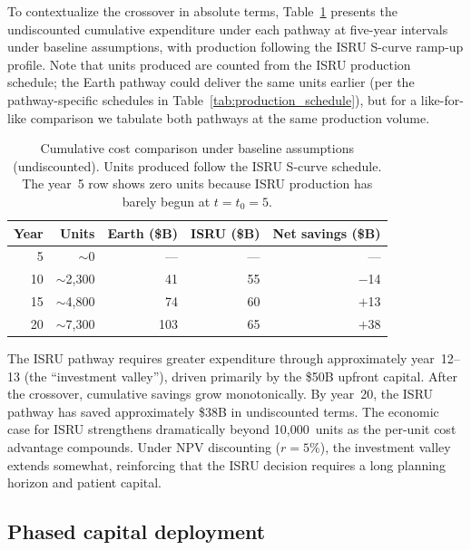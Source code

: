 \documentclass[preprint,12pt]{elsarticle}
\begin{document}
To contextualize the crossover in absolute terms, Table~\ref{tab:cumulative} presents the undiscounted cumulative expenditure under each pathway at five-year intervals under baseline assumptions, with production following the ISRU S-curve ramp-up profile. Note that units produced are counted from the ISRU production schedule; the Earth pathway could deliver the same units earlier (per the pathway-specific schedules in Table~\ref{tab:production_schedule}), but for a like-for-like comparison we tabulate both pathways at the same production volume.

\begin{table}[htbp]
\centering
\caption{Cumulative cost comparison under baseline assumptions (undiscounted). Units produced follow the ISRU S-curve schedule. The year~5 row shows zero units because ISRU production has barely begun at $t = t_0 = 5$.}
\label{tab:cumulative}
\begin{tabular}{@{}rrrrr@{}}
\toprule
Year & Units & Earth (\$B) & ISRU (\$B) & Net savings (\$B) \\
\midrule
5  & $\sim$0     & ---  & ---   & ---    \\
10 & $\sim$2{,}300 & 41  & 55   & $-$14  \\
15 & $\sim$4{,}800 & 74  & 60   & $+$13  \\
20 & $\sim$7{,}300 & 103 & 65   & $+$38  \\
\bottomrule
\end{tabular}
\end{table}

The ISRU pathway requires greater expenditure through approximately year~12--13 (the ``investment valley''), driven primarily by the \$50B upfront capital. After the crossover, cumulative savings grow monotonically. By year~20, the ISRU pathway has saved approximately \$38B in undiscounted terms. The economic case for ISRU strengthens dramatically beyond 10{,}000~units as the per-unit cost advantage compounds. Under NPV discounting ($r = 5\%$), the investment valley extends somewhat, reinforcing that the ISRU decision requires a long planning horizon and patient capital.

\subsection{Phased capital deployment}
\label{sec:phased_capital}
\end{document}
